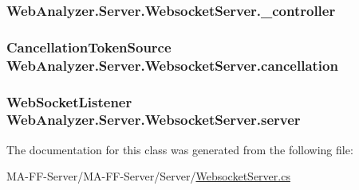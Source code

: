 \subsubsection[{\+\_\+controller}]{ Web\+Analyzer.\+Server.\+Websocket\+Server.\+\_\+controller\hspace{0.3cm}{\ttfamily [private]}}\label{class_web_analyzer_1_1_server_1_1_websocket_server_ae9083f25b4a1b713998b19eb68e35d6e}
\hypertarget{class_web_analyzer_1_1_server_1_1_websocket_server_ac6ff75e9f3bc2200953d755b029e5344}{}
\subsubsection[{cancellation}]{\setlength{\rightskip}{0pt plus 5cm}Cancellation\+Token\+Source Web\+Analyzer.\+Server.\+Websocket\+Server.\+cancellation\hspace{0.3cm}{\ttfamily [private]}}\label{class_web_analyzer_1_1_server_1_1_websocket_server_ac6ff75e9f3bc2200953d755b029e5344}
\hypertarget{class_web_analyzer_1_1_server_1_1_websocket_server_abc42c992699d787cfdcb33f9e51140b4}{}
\subsubsection[{server}]{\setlength{\rightskip}{0pt plus 5cm}Web\+Socket\+Listener Web\+Analyzer.\+Server.\+Websocket\+Server.\+server\hspace{0.3cm}{\ttfamily [private]}}\label{class_web_analyzer_1_1_server_1_1_websocket_server_abc42c992699d787cfdcb33f9e51140b4}


The documentation for this class was generated from the following file\+:\begin{DoxyCompactItemize}
\item 
M\+A-\/\+F\+F-\/\+Server/\+M\+A-\/\+F\+F-\/\+Server/\+Server/\hyperlink{_websocket_server_8cs}{Websocket\+Server.\+cs}\end{DoxyCompactItemize}
